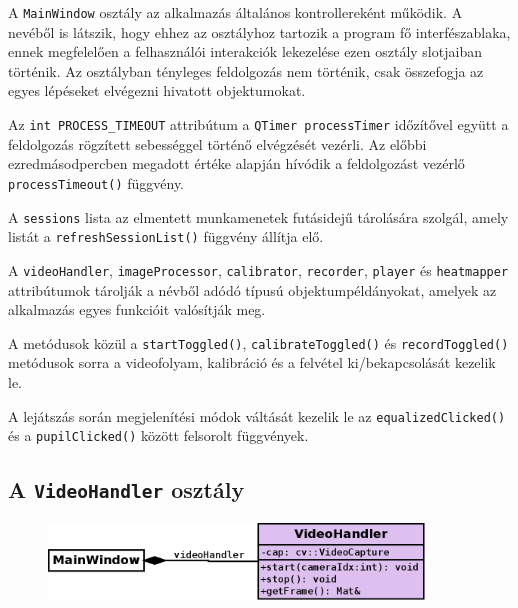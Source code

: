 A \texttt{MainWindow} osztály az alkalmazás általános kontrollereként működik. A nevéből is látszik, hogy ehhez az osztályhoz tartozik a program fő interfészablaka, ennek megfelelően a felhasználói interakciók lekezelése ezen osztály slotjaiban történik. Az osztályban tényleges feldolgozás nem történik, csak összefogja az egyes lépéseket elvégezni hivatott objektumokat.

\bigskip

Az \texttt{int PROCESS\_TIMEOUT} attribútum a \texttt{QTimer processTimer} időzítővel együtt a feldolgozás rögzített sebességgel történő elvégzését vezérli. Az előbbi ezredmásodpercben megadott értéke alapján hívódik a feldolgozást vezérlő \texttt{processTimeout()} függvény.

A \texttt{sessions} lista az elmentett munkamenetek futásidejű tárolására szolgál, amely listát a \texttt{refreshSessionList()} függvény állítja elő.

A \texttt{videoHandler}, \texttt{imageProcessor}, \texttt{calibrator}, \texttt{recorder}, \texttt{player} és \texttt{heatmapper} attribútumok tárolják a névből adódó típusú objektumpéldányokat, amelyek az alkalmazás egyes funkcióit valósítják meg.

A metódusok közül a \texttt{startToggled()}, \texttt{calibrateToggled()} és \texttt{recordToggled()} metódusok sorra a videofolyam, kalibráció és a felvétel ki/bekapcsolását kezelik le.

A lejátszás során megjelenítési módok váltását kezelik le az \texttt{equalizedClicked()} és a \texttt{pupilClicked()} között felsorolt függvények.

\subsection{A \texttt{VideoHandler} osztály}\label{sect:videohandler}

\begin{figure}[!ht]
\centering
\includegraphics[width=100mm, keepaspectratio]{figures/class_videohandler.png}
\end{figure}

